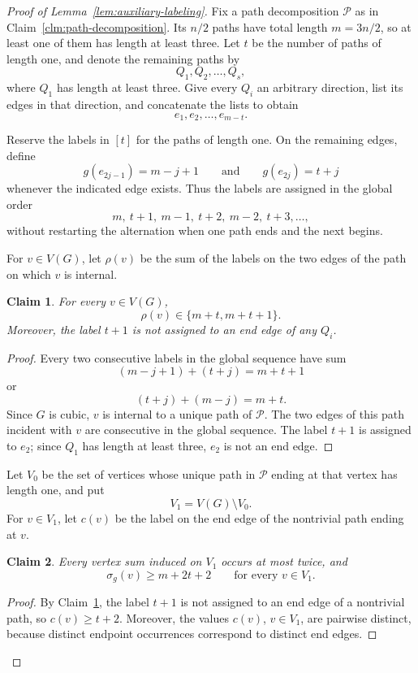 \documentclass[preprint,12pt]{elsarticle}
\newtheorem{claim}{Claim}[section]
\begin{document}
\begin{proof}[Proof of Lemma~\ref{lem:auxiliary-labeling}]
Fix a path decomposition \(\mathcal P\) as in
Claim~\ref{clm:path-decomposition}. Its \(n/2\) paths have total length
\(m=3n/2\), so at least one of them has length at least three. Let \(t\)
be the number of paths of length one, and denote the remaining paths by
\[
Q_1,Q_2,\ldots,Q_s,
\]
where \(Q_1\) has length at least three. Give every \(Q_i\) an arbitrary
direction, list its edges in that direction, and concatenate the lists to
obtain
\[
e_1,e_2,\ldots,e_{m-t}.
\]

Reserve the labels in \([t]\) for the paths of length one. On the
remaining edges, define
\[
g(e_{2j-1})=m-j+1
\qquad\text{and}\qquad
g(e_{2j})=t+j
\]
whenever the indicated edge exists. Thus the labels are assigned in the
global order
\[
m,\ t+1,\ m-1,\ t+2,\ m-2,\ t+3,\ldots,
\]
without restarting the alternation when one path ends and the next
begins.

For \(v\in V(G)\), let \(\rho(v)\) be the sum of the labels on the two
edges of the path on which \(v\) is internal.

\begin{claim}
\label{clm:internal-pair-sums}
For every \(v\in V(G)\),
\[
\rho(v)\in\{m+t,m+t+1\}.
\]
Moreover, the label \(t+1\) is not assigned to an end edge of any
\(Q_i\).
\end{claim}

\begin{proof}
Every two consecutive labels in the global sequence have sum
\[
(m-j+1)+(t+j)=m+t+1
\]
or
\[
(t+j)+(m-j)=m+t.
\]
Since \(G\) is cubic, \(v\) is internal to a unique path of
\(\mathcal P\). The two edges of this path incident with \(v\) are
consecutive in the global sequence. The label \(t+1\) is assigned to
\(e_2\); since \(Q_1\) has length at least three, \(e_2\) is not an end
edge.
\end{proof}

Let \(V_0\) be the set of vertices whose unique path in \(\mathcal P\)
ending at that vertex has length one, and put
\[
V_1=V(G)\setminus V_0.
\]
For \(v\in V_1\), let \(c(v)\) be the label on the end edge of the
nontrivial path ending at \(v\).

\begin{claim}
\label{clm:V1-sums}
Every vertex sum induced on \(V_1\) occurs at most twice, and
\[
\sigma_g(v)\ge m+2t+2
\qquad\text{for every }v\in V_1.
\]
\end{claim}

\begin{proof}
By Claim~\ref{clm:internal-pair-sums}, the label \(t+1\) is not assigned
to an end edge of a nontrivial path, so \(c(v)\ge t+2\). Moreover, the
values \(c(v)\), \(v\in V_1\), are pairwise distinct, because distinct
endpoint occurrences correspond to distinct end edges.


\end{proof}
\end{proof}
\end{document}
